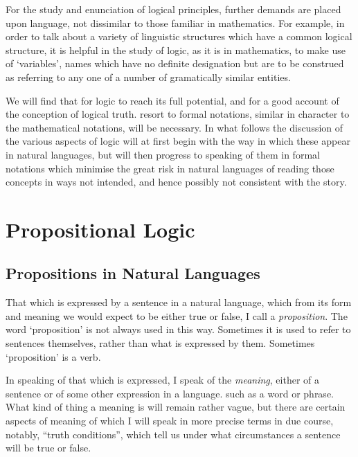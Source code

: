 \documentclass[10pt,titlepage]{article}
\begin{document}
For the study and enunciation of logical principles, further demands are placed upon language, not dissimilar to those familiar in mathematics.
For example, in order to talk about a variety of linguistic structures which have a common logical structure, it is helpful in the study of logic, as it is in mathematics, to make use of `variables', names which have no definite designation but are to be construed as referring to any one of a number of gramatically similar entities.

We will find that for logic to reach its full potential, and for a good account of the conception of logical truth. resort to formal notations, similar in character to the mathematical notations, will be necessary.
In what follows the discussion of the various aspects of logic will at first begin with the way in which these appear in natural languages, but will then progress to speaking of them in formal notations which minimise the great risk in natural languages of reading those concepts in ways not intended, and hence possibly not consistent with the story.

\section{Propositional Logic}

\subsection{Propositions in Natural Languages}

That which is expressed by a sentence in a natural language, which from its form and meaning we would expect to be either true or false, I call a {\it proposition}.
The word `proposition' is not always used in this way.
Sometimes it is used to refer to sentences themselves, rather than what is expressed by them.
Sometimes `proposition' is a verb.

In speaking of that which is expressed, I speak of the \emph{meaning}, either of a sentence or of some other expression in a language. such as a word or phrase.
What kind of thing a meaning is will remain rather vague, but there are certain aspects of meaning of which I will speak in more precise terms in due course, notably, ``truth conditions'', which tell us under what circumstances a sentence will be true or false.
\end{document}
